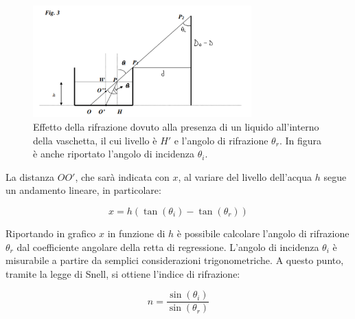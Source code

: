 \begin{figure}[H]
	\centering
	\includegraphics[width=0.75\textwidth]{./figures/Im3}
	\caption{Effetto della rifrazione dovuto alla presenza di un liquido all'interno della vaschetta, il cui livello è $H'$ e l'angolo di rifrazione $\theta_r$. In figura è anche riportato l'angolo di incidenza $\theta_i$.}
\end{figure}

La distanza $OO'$, che sarà indicata con $x$, al variare del livello dell'acqua $h$ segue un andamento lineare, in particolare: 

\begin{equation}
	x=h(\tan(\theta_i)-\tan(\theta_r))
\end{equation}

Riportando in grafico $x$ in funzione di $h$ è possibile calcolare l'angolo di rifrazione $\theta_r$ dal coefficiente angolare della retta di regressione. L'angolo di incidenza $\theta_i$ è misurabile a partire da semplici considerazioni trigonometriche. A questo punto, tramite la legge di Snell, si ottiene l'indice di rifrazione:

\begin{equation}
	n=\frac{\sin(\theta_i)}{\sin(\theta_r)}
\end{equation}

